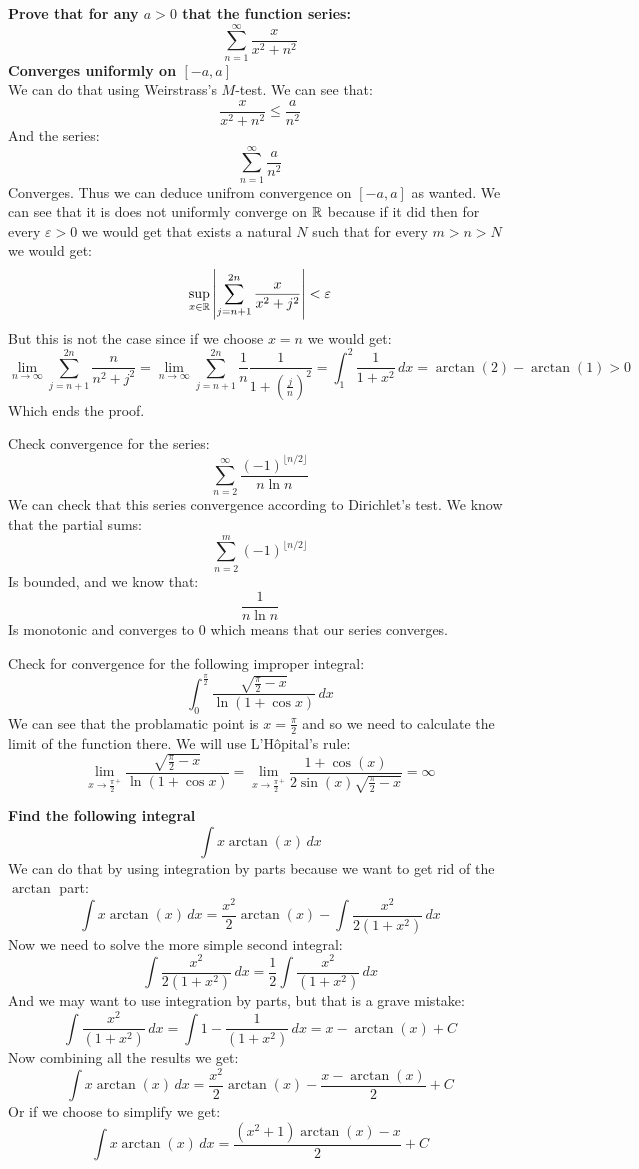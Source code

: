 \documentclass[11pt,a4paper]{article}
\begin{document}
	\textbf{Prove that for any $a > 0$ that the function series:
	\[
		\sum_{n=1}^{\infty}{\frac{x}{x^2+n^2}}
	\]
	Converges uniformly on $[-a,a]$} \\
	We can do that using Weirstrass's $M$-test. We can see that:
	\[
		\frac{x}{x^2+n^2} \le \frac{a}{n^2}
	\]
	And the series:
	\[
		\sum_{n=1}^{\infty}{\frac{a}{n^2}}
	\]
	Converges. Thus we can deduce unifrom convergence on $[-a,a]$ as wanted.
	We can see that it is does not uniformly converge on $\mathbb{R}$ because
	if it did then for every $\varepsilon > 0$ we would get that exists
	a natural $N$ such that for every $m > n > N$ we would get:
	\[
		\sup_{x\in\mathbb{R}} \left| \sum_{j=n+1}^{2n}{\frac{x}{x^2+j^2}}
		\right| < \varepsilon
	\]
	But this is not the case since if we choose $x=n$ we would get:
	\[
		\lim_{n\to\infty}\sum_{j=n+1}^{2n}{\frac{n}{n^2+j^2}} =
		\lim_{n\to\infty}\sum_{j=n+1}^{2n}
		{\frac{1}{n}\frac{1}{1+(\frac{j}{n})^2}} = 
		\int_1^2{\frac{1}{1+x^2}\,dx} = \arctan(2) - \arctan(1) > 0
	\]
	Which ends the proof.
	
	\newpage
	
	Check convergence for the series:
	\[
		\sum_{n=2}^{\infty} {\frac{(-1)^{\lfloor n/2 \rfloor}}{n\ln n}}
	\]
	We can check that this series convergence according to Dirichlet's
	test. We know that the partial sums:
	\[
		\sum_{n=2}^{m}{(-1)^{\lfloor n/2 \rfloor}}
	\]
	Is bounded, and we know that:
	\[
		{\frac{1}{n\ln n}}
	\]
	Is monotonic and converges to $0$ which means that our series converges.
	
	\newpage
	
	Check for convergence for the following improper integral:
	\[
		\int_{0}^{\frac{\pi}{2}}
		{\frac{\sqrt{\frac{\pi}{2}-x}}{\ln(1+\cos x)}\,dx}
	\]
	We can see that the problamatic point is $x = \frac{\pi}{2}$ and
	so we need to calculate the limit of the function there. We will
	use L'H\^opital's rule:
	\[
		\lim_{x\to\frac{\pi}{2}^+}
		{\frac{\sqrt{\frac{\pi}{2}-x}}{\ln(1+\cos x)}} = 
		\lim_{x\to\frac{\pi}{2}^+}
		\frac{1+\cos(x)}{2\sin(x)\sqrt{\frac{\pi}{2}-x}} = \infty
	\]
	
	
	\newpage
	
	\textbf{Find the following integral}
	\[
		\int{x\arctan(x)\,dx}
	\]
	We can do that by using integration by parts because we want to get rid
	of the $\arctan$ part:
	\[
		\int{x\arctan(x)\,dx} = 
		\frac{x^2}{2}\arctan(x) - 
		\int{\frac{x^2}{2(1+x^2)}\,dx}
	\]
	Now we need to solve the more simple second integral:
	\[
		\int{\frac{x^2}{2(1+x^2)}\,dx} = 
		\frac{1}{2}\int{\frac{x^2}{(1+x^2)}\,dx}
	\]
	And we may want to use integration by parts, but that is a grave mistake:
	\[
		\int{\frac{x^2}{(1+x^2)}\,dx} =
		\int{1 - \frac{1}{(1+x^2)}\,dx} = x - \arctan(x) + C
	\]
	Now combining all the results we get:
	\[
		\int{x\arctan(x)\,dx} = 
		\frac{x^2}{2}\arctan(x) - 
		\frac{x - \arctan(x)}{2} + C
	\]
	Or if we choose to simplify we get:
	\[
		\int{x\arctan(x)\,dx} = 
		\frac{(x^2+1)\arctan(x) - x}{2} + C
	\] 
	
	
	
	
	
	
	
	
	
\end{document}

